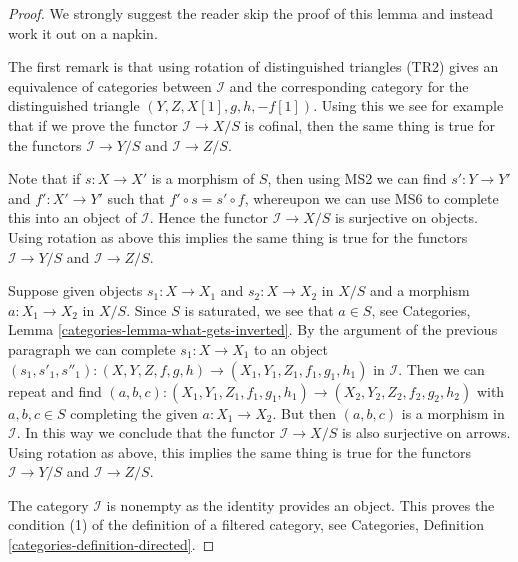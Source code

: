 \begin{proof}
We strongly suggest the reader skip the proof of this lemma and instead
work it out on a napkin.

\medskip\noindent
The first remark is that using rotation of distinguished triangles (TR2)
gives an equivalence of categories between $\mathcal{I}$ and the
corresponding category for the distinguished triangle
$(Y, Z, X[1], g, h, -f[1])$. Using this we see for example that if
we prove the functor $\mathcal{I} \to X/S$ is cofinal, then
the same thing is true for the functors $\mathcal{I} \to Y/S$ and
$\mathcal{I} \to Z/S$.

\medskip\noindent
Note that if $s : X \to X'$ is a morphism of $S$, then using
MS2 we can find $s' : Y \to Y'$ and $f' : X' \to Y'$ such that
$f' \circ s = s' \circ f$, whereupon we can use MS6 to complete
this into an object of $\mathcal{I}$. Hence the functor
$\mathcal{I} \to X/S$ is surjective on objects. Using rotation as above
this implies the same thing is true for the functors
$\mathcal{I} \to Y/S$ and $\mathcal{I} \to Z/S$.

\medskip\noindent
Suppose given objects $s_1 : X \to X_1 $ and $s_2 : X \to X_2$ in
$X/S$ and a morphism $a : X_1 \to X_2$ in $X/S$. Since $S$ is saturated,
we see that $a \in S$, see
Categories, Lemma \ref{categories-lemma-what-gets-inverted}.
By the argument of the previous paragraph we can complete
$s_1 : X \to X_1$ to an object
$(s_1, s'_1, s''_1) : (X, Y, Z, f, g, h) \to (X_1, Y_1, Z_1, f_1, g_1, h_1)$
in $\mathcal{I}$. Then we can repeat and find
$(a, b, c) : (X_1, Y_1, Z_1, f_1, g_1, h_1) \to (X_2, Y_2, Z_2, f_2, g_2, h_2)$
with $a, b, c \in S$ completing the given $a : X_1 \to X_2$.
But then $(a, b, c)$ is a morphism in $\mathcal{I}$.
In this way we conclude that the functor $\mathcal{I} \to X/S$ is
also surjective on arrows. Using rotation as above,
this implies the same thing is true for the functors
$\mathcal{I} \to Y/S$ and $\mathcal{I} \to Z/S$.

\medskip\noindent
The category $\mathcal{I}$ is nonempty as the identity provides an object.
This proves the condition (1) of the definition of a filtered category, see
Categories, Definition \ref{categories-definition-directed}.


\end{proof}
